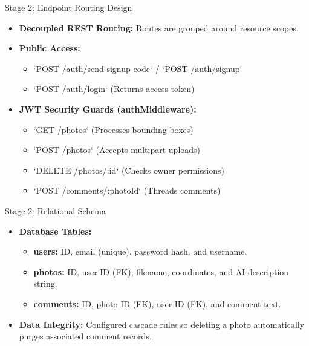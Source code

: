 \documentclass[aspectratio=169]{beamer}
\begin{document}
\begin{frame}{Stage 2: Endpoint Routing Design}
  \begin{itemize}
    \item \textbf{Decoupled REST Routing:} Routes are grouped around resource scopes.
    \item \textbf{Public Access:}
      \begin{itemize}
        \item `POST /auth/send-signup-code` / `POST /auth/signup`
        \item `POST /auth/login` (Returns access token)
      \end{itemize}
    \item \textbf{JWT Security Guards (authMiddleware):}
      \begin{itemize}
        \item `GET /photos` (Processes bounding boxes)
        \item `POST /photos` (Accepts multipart uploads)
        \item `DELETE /photos/:id` (Checks owner permissions)
        \item `POST /comments/:photoId` (Threads comments)
      \end{itemize}
  \end{itemize}
\end{frame}

\begin{frame}{Stage 2: Relational Schema}
  \begin{itemize}
    \item \textbf{Database Tables:}
      \begin{itemize}
        \item \textbf{users:} ID, email (unique), password hash, and username.
        \item \textbf{photos:} ID, user ID (FK), filename, coordinates, and AI description string.
        \item \textbf{comments:} ID, photo ID (FK), user ID (FK), and comment text.
      \end{itemize}
    \item \textbf{Data Integrity:} Configured cascade rules so deleting a photo automatically purges associated comment records.
  \end{itemize}
\end{frame}
\end{document}
